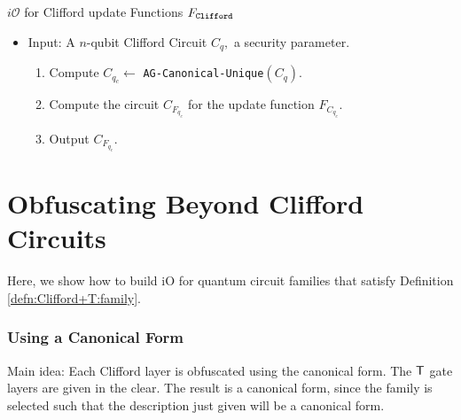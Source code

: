 \begin{algorithm}[H]
   \caption{$i\mathcal{O}$ for Clifford update Functions $F_{\tt Clifford}$}
  \begin{itemize}
  \item Input: A $n$-qubit Clifford Circuit $C_q,$ a security parameter.
  \begin{enumerate}
  \item Compute $C_{q_c}\leftarrow$ {\tt AG-Canonical-Unique}$(C_q).$
  \item Compute the circuit $C_{F_{q_c}}$ for the update function $F_{C_{q_c}}.$
  \item Output $C_{F_{q_c}}.$
  \end{enumerate}
  \end{itemize}
\end{algorithm}

\section{Obfuscating Beyond Clifford Circuits}
Here, we show how to build iO for quantum circuit families that satisfy Definition \ref{defn:Clifford+T:family}.

\subsubsection{Using a Canonical Form}
Main idea: Each Clifford layer is obfuscated using the canonical form. The ${\sf T}$ gate layers are given in the clear. The result is a canonical form, since the family is selected such that the description just given will be a canonical form.



